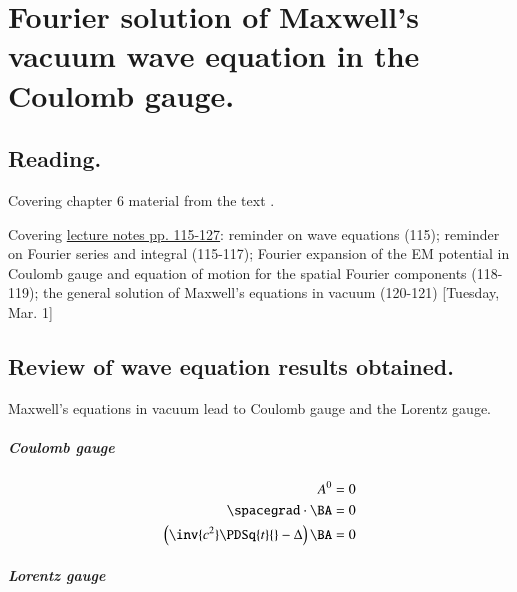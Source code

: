 %
%

\chapter{Fourier solution of Maxwell's vacuum wave equation in the Coulomb gauge.}
\label{chap:relativisticElectrodynamicsL15}
{}
\date{Mar 1, 2011}

\beginArtNoToc

\section{Reading.}

Covering chapter 6 material from the text \cite{landau1980classical}.

Covering \href{http://www.physics.utoronto.ca/~poppitz/e-poppitz/PHY450_files/RelEMpp115-127.pdf}{lecture notes pp. 115-127}: reminder on wave equations (115); reminder on Fourier series and integral (115-117); Fourier expansion of the EM potential in Coulomb gauge and equation of motion for the spatial Fourier components (118-119); the general solution of Maxwell's equations in vacuum (120-121) [Tuesday, Mar. 1]

\section{Review of wave equation results obtained.}

Maxwell's equations in vacuum lead to Coulomb gauge and the Lorentz gauge.

\paragraph{Coulomb gauge}

\begin{align}\label{eqn:relativisticElectrodynamicsL15:10}
A^0 &= 0 \\
\spacegrad \cdot \BA &= 0 \\
\left( \inv{c^2} \PDSq{t}{} - \Delta \right) \BA &= 0
\end{align}

\paragraph{Lorentz gauge}


